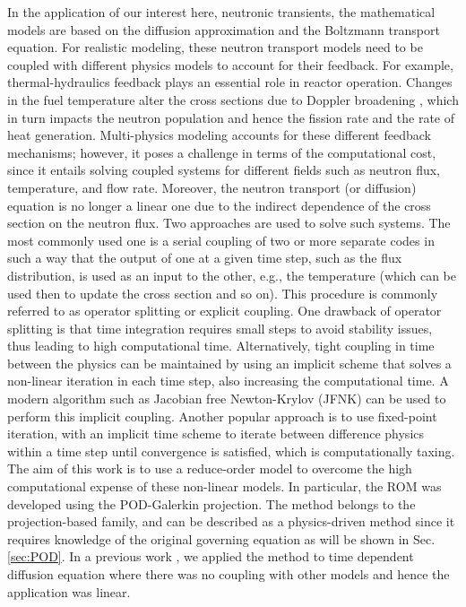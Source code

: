 \documentclass[]{interact}
\theoremstyle{plain}%
\theoremstyle{definition}
\theoremstyle{remark}
\begin{document}
In the application of our interest here, neutronic transients, the mathematical models are based on the diffusion approximation and the Boltzmann transport equation.
For realistic modeling, these neutron transport models need to be coupled with different physics models to account for their feedback.
For example, thermal-hydraulics feedback plays an essential role in reactor operation.
Changes in the fuel temperature alter the cross sections due to Doppler broadening \cite{stacey2018nuclear}, which in turn impacts the neutron population and hence the fission rate and the rate of heat generation.
Multi-physics modeling accounts for these different feedback mechanisms; however, it poses a challenge in terms of the computational cost,
since it entails solving coupled systems for different fields such as neutron flux, temperature, and flow rate.
Moreover, the neutron transport (or diffusion) equation is no longer a linear one due to the indirect dependence of the cross section on the neutron flux.
Two approaches are used to solve such systems.
The most commonly used one is a serial coupling of two or more separate codes in such a way that the output of one at a given time step, such as the flux distribution, is used as an input to the other, e.g., the temperature (which can be used then to update the cross section and so on).
This procedure is commonly referred to as operator splitting or explicit coupling.
One drawback of operator splitting is that time integration requires small steps to avoid stability issues, thus leading to high computational time. 
Alternatively, tight coupling in time between the physics can be maintained by using an implicit scheme that solves a non-linear iteration in each time step, also increasing the computational time.
A modern algorithm such as Jacobian free Newton-Krylov (JFNK) \cite{gaston2009parallel} can be used to perform this implicit coupling.
Another popular approach is to use fixed-point iteration, with an implicit time scheme to iterate between difference physics within a time step until convergence is satisfied, which is computationally taxing.
The aim of this work is to use a reduce-order model to overcome the high computational expense of these non-linear models.
In particular, the ROM was developed using the POD-Galerkin projection.
The method belongs to the projection-based family, and can be described as a physics-driven method since it requires knowledge of the original governing equation as will be shown in Sec.\ref{sec:POD}.
In a previous work \cite{elzohery2021modeling}, we applied the method to time dependent diffusion equation where there was no coupling with other models and hence the application was linear.
\end{document}
